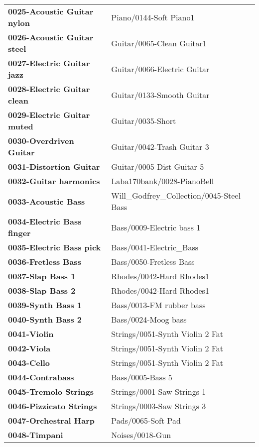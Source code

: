 \begin{longtable}{|l l|}
   \textbf{0025-Acoustic Guitar nylon} &
      Piano/0144-Soft Piano1 \\
   \textbf{0026-Acoustic Guitar steel} &
      Guitar/0065-Clean Guitar1 \\
   \textbf{0027-Electric Guitar jazz} &
      Guitar/0066-Electric Guitar \\
   \textbf{0028-Electric Guitar clean} &
      Guitar/0133-Smooth Guitar \\
   \textbf{0029-Electric Guitar muted} &
      Guitar/0035-Short \\
   \textbf{0030-Overdriven Guitar} &
      Guitar/0042-Trash Guitar 3 \\
   \textbf{0031-Distortion Guitar} &
      Guitar/0005-Dist Guitar 5 \\
   \textbf{0032-Guitar harmonics} &
      Laba170bank/0028-PianoBell \\
   \textbf{0033-Acoustic Bass} &
      Will\_Godfrey\_Collection/0045-Steel Bass \\
   \textbf{0034-Electric Bass finger} &
      Bass/0009-Electric bass 1 \\
   \textbf{0035-Electric Bass pick} &
      Bass/0041-Electric\_Bass \\
   \textbf{0036-Fretless Bass} &
      Bass/0050-Fretless Bass \\
   \textbf{0037-Slap Bass 1} &
      Rhodes/0042-Hard Rhodes1 \\
   \textbf{0038-Slap Bass 2} &
      Rhodes/0042-Hard Rhodes1 \\
   \textbf{0039-Synth Bass 1} &
      Bass/0013-FM rubber bass \\
   \textbf{0040-Synth Bass 2} &
      Bass/0024-Moog bass \\
   \textbf{0041-Violin} &
      Strings/0051-Synth Violin 2 Fat \\
   \textbf{0042-Viola} &
      Strings/0051-Synth Violin 2 Fat \\
   \textbf{0043-Cello} &
      Strings/0051-Synth Violin 2 Fat \\
   \textbf{0044-Contrabass} &
      Bass/0005-Bass 5 \\
   \textbf{0045-Tremolo Strings} &
      Strings/0001-Saw Strings 1 \\
   \textbf{0046-Pizzicato Strings} &
      Strings/0003-Saw Strings 3 \\
   \textbf{0047-Orchestral Harp} &
      Pads/0065-Soft Pad \\
   \textbf{0048-Timpani} &
      Noises/0018-Gun \\

\end{longtable}
